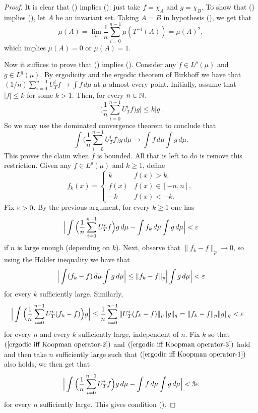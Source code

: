 \begin{proof}
It is clear that () implies (): just take $f=\chi_A$ and $g=\chi_B$. To show that () implies (), let $A$ be an invariant set. Taking $A=B$ in hypothesis (), we get that
\[\mu(A)=\lim_n\frac{1}{n}\sum_{i=0}^{n-1}\mu(T^{-i}(A))=\mu(A)^2,\]
which implies $\mu(A)=0$ or $\mu(A)=1$.\par
Now it suffices to prove that () implies (). Consider any $f\in L^p(\mu)$ and $g\in L^q(\mu)$. By ergodicity and the ergodic theorem of Birkhoff we have that $(1/n)\sum_{i=0}^{n-1}U_T^if\to\int f\,d\mu$ at $\mu$-almost every point. Initially, assume that $|f|\leq k$ for some $k>1$. Then, for every $n\in\mathbb{N}$,
\[\Big|\Big(\frac{1}{n}\sum_{i=0}^{n-1}U_T^if\Big)g\Big|\leq k|g|.\]
So we may use the dominated convergence theorem to conclude that
\[\int\Big(\frac{1}{n}\sum_{i=0}^{n-1}U_T^if\Big)g\,d\mu\to\int f\,d\mu\int g\,d\mu.\]
This proves the claim when $f$ is bounded. All that is left to do is remove
this restriction. Given any $f\in L^p(\mu)$ and $k\geq 1$, define
\[f_k(x)=\begin{cases}
k&f(x)>k,\\
f(x)&f(x)\in[-n,n],\\
-k&f(x)<-k.
\end{cases}\]
Fix $\varepsilon>0$. By the previous argument, for every $k\geq 1$ one has
\begin{align}\label{ergodic iff Koopman operator-1}
\Big|\int\Big(\frac{1}{n}\sum_{i=0}^{n-1}U_T^if\Big)g\,d\mu-\int f_k\,d\mu\int g\,d\mu\Big|<\varepsilon
\end{align}
if $n$ is large enough (depending on $k$). Next, observe that $\|f_k-f\|_p\to 0$, so using the H\"older inequality we have that
\begin{align}\label{ergodic iff Koopman operator-2}
\Big|\int(f_k-f)\,d\mu\int g\,d\mu\Big|\leq\|f_k-f\|_p\Big|\int g\,d\mu\Big|<\varepsilon
\end{align}
for every $k$ sufficiently large. Similarly,
\begin{equation}\label{ergodic iff Koopman operator-3}
\begin{aligned}
\Big|\int\Big(\frac{1}{n}\sum_{i=0}^{n-1}U_T^i(f_k-f)\Big)g\Big|&\leq\frac{1}{n}\sum_{i=0}^{n-1}\|U_T^i(f_k-f)\|_p\|g\|_q=\|f_k-f\|_p\|g\|_q<\varepsilon
\end{aligned}
\end{equation}
for every $n$ and every $k$ sufficiently large, independent of $n$. Fix $k$ so that $(\ref{ergodic iff Koopman operator-2})$ and $(\ref{ergodic iff Koopman operator-3})$ hold and then take $n$ sufficiently large such that $(\ref{ergodic iff Koopman operator-1})$ also holds, we then get that
\[\Big|\int\Big(\frac{1}{n}\sum_{i=0}^{n-1}U_T^if\Big)g\,d\mu-\int f\,d\mu\int g\,d\mu\Big|<3\varepsilon\]
for every $n$ sufficiently large. This gives condition ().
\end{proof}
